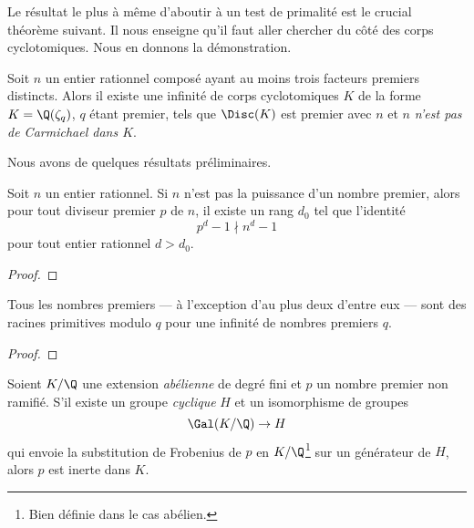 Le résultat le plus à même d'aboutir à un test de primalité est le crucial théorème suivant. Il nous enseigne qu'il faut aller chercher du côté des corps cyclotomiques. Nous en donnons la démonstration.

\begin{theoreme}\label{theoreme-3.6}
	Soit $n$ un entier rationnel composé ayant au moins trois facteurs premiers distincts. Alors il existe une infinité de corps cyclotomiques $K$ de la forme $K = \Q(\zeta_q)$, $q$ étant premier, tels que $\Disc(K)$ est premier avec $n$ et $n$ \emph{n'est pas de Carmichael dans $K$}.
\end{theoreme}

Nous avons de quelques résultats préliminaires.

\begin{lemme}\label{lemme-3.3}
	Soit $n$ un entier rationnel. Si $n$ n'est pas la puissance d'un nombre premier, alors pour tout diviseur premier $p$ de $n$, il existe un rang $d_0$ tel que l'identité \[p^d - 1 \nmid n^d - 1\] pour tout entier rationnel $d> d_0$.
\end{lemme}

\begin{proof}
\end{proof}

\begin{lemme}\label{heath-brown}
	Tous les nombres premiers — à l'exception d'au plus deux d'entre eux — sont des racines primitives modulo $q$ pour une infinité de nombres premiers $q$.
\end{lemme}

\begin{proof}
\end{proof}

\begin{lemme}\label{lemme-inerte}
	Soient $K/\Q$ une extension \emph{abélienne} de degré fini et $p$ un nombre premier non ramifié. S'il existe un groupe \emph{cyclique} $H$ et un isomorphisme de groupes \[\Gal(K/\Q) \to H\] qui envoie la substitution de Frobenius de $p$ en $K/\Q$\footnote{Bien définie dans le cas abélien.} sur un générateur de $H$, alors $p$ est inerte dans $K$.
\end{lemme}

